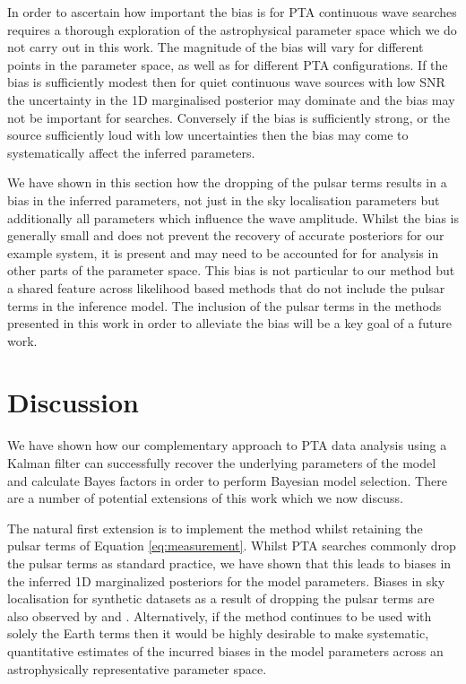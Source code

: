 \documentclass[fleqn,usenatbib,useAMS]{mnras}
\begin{document}
In order to ascertain how important the bias is for PTA continuous wave searches requires a thorough exploration of the astrophysical parameter space which we do not carry out in this work. The magnitude of the bias will vary for different points in the parameter space, as well as for different PTA configurations. If the bias is sufficiently modest then for quiet continuous wave sources with low SNR the uncertainty in the 1D marginalised posterior may dominate and the bias may not be important for searches. Conversely if the bias is sufficiently strong, or the source sufficiently loud with low uncertainties then the bias may come to systematically affect the inferred parameters. \newline  

We have shown in this section how the dropping of the pulsar terms results in a bias in the inferred parameters, not just in the sky localisation parameters  \citep[e.g.][]{Zhupulsarterms,Chen2022} but additionally all parameters which influence the wave amplitude. Whilst the bias is generally small and does not prevent the recovery of accurate posteriors for our example system, it is present and may need to be accounted for for analysis in other parts of the parameter space. This bias is not particular to our method but a shared feature across likelihood based methods that do not include the pulsar terms in the inference model. The inclusion of the pulsar terms in the methods presented in this work in order to alleviate the bias will be a key goal of a future work. 



\section{Discussion}
We have shown how our complementary approach to PTA data analysis using a Kalman filter can successfully recover the underlying parameters of the model and calculate Bayes factors in order to perform Bayesian model selection. There are a number of potential extensions of this work which we now discuss.  \newline 

The natural first extension is to implement the method whilst retaining the pulsar terms of Equation \ref{eq:measurement}. Whilst PTA searches commonly drop the pulsar terms as standard practice, we have shown that this leads to biases in the inferred 1D marginalized posteriors for the model parameters. Biases in sky localisation for synthetic datasets as a result of dropping the pulsar terms are also observed by \cite{Zhupulsarterms} and \cite{Chen2022}. Alternatively, if the method continues to be used with solely the Earth terms then it would be highly desirable to make systematic, quantitative estimates of the incurred biases in the model parameters across an astrophysically representative parameter space. \newline 
\end{document}
